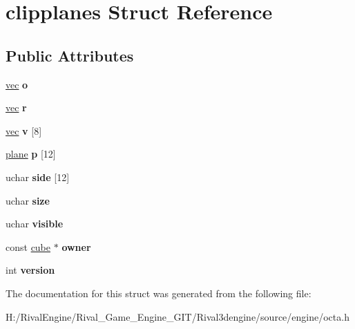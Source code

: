 \hypertarget{structclipplanes}{}\section{clipplanes Struct Reference}
\label{structclipplanes}
\subsection*{Public Attributes}
\begin{DoxyCompactItemize}
\item 
\mbox{\label{structclipplanes_a5da4fb7e93fcaa3b0be7c30e366a392f}} 
\hyperlink{structvec}{vec} {\bfseries o}
\item 
\mbox{\label{structclipplanes_ae24b29f89e8518b64364ed7b8c85e185}} 
\hyperlink{structvec}{vec} {\bfseries r}
\item 
\mbox{\label{structclipplanes_a1d90cda4b387ea99e1530e009dd55b4c}} 
\hyperlink{structvec}{vec} {\bfseries v} \mbox{[}8\mbox{]}
\item 
\mbox{\label{structclipplanes_a11c407435f23114b2d642a6eac15a8cf}} 
\hyperlink{structplane}{plane} {\bfseries p} \mbox{[}12\mbox{]}
\item 
\mbox{\label{structclipplanes_a15f94cd17e5577aff13fa3106935ac20}} 
uchar {\bfseries side} \mbox{[}12\mbox{]}
\item 
\mbox{\label{structclipplanes_a9aa5a175a030ed67c72544d609495880}} 
uchar {\bfseries size}
\item 
\mbox{\label{structclipplanes_a3527cda11e5186a6562a44881ff44657}} 
uchar {\bfseries visible}
\item 
\mbox{\label{structclipplanes_a9fa9954f5bf6ccdf8b26c5fff5231240}} 
const \hyperlink{structcube}{cube} $\ast$ {\bfseries owner}
\item 
\mbox{\label{structclipplanes_af37212c0295578fefef0b274a9d4e22e}} 
int {\bfseries version}
\end{DoxyCompactItemize}


The documentation for this struct was generated from the following file\+:\begin{DoxyCompactItemize}
\item 
H\+:/\+Rival\+Engine/\+Rival\+\_\+\+Game\+\_\+\+Engine\+\_\+\+G\+I\+T/\+Rival3dengine/source/engine/octa.\+h\end{DoxyCompactItemize}
